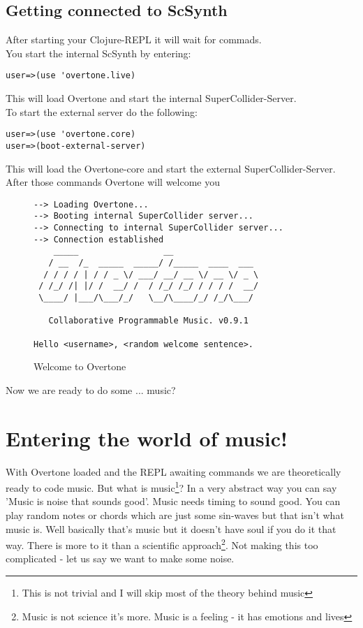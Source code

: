 \section{Getting connected to ScSynth}
After starting your Clojure-\gls{REPL} it will wait for commads.\\
You start the internal \gls{ScSynth} by entering:
\begin{lstlisting}
user=>(use 'overtone.live)
\end{lstlisting}
This will load Overtone and start the internal SuperCollider-Server.\\

To start the external server do the following:
\begin{lstlisting}
user=>(use 'overtone.core)
user=>(boot-external-server)
\end{lstlisting}
This will load the Overtone-core and start the external SuperCollider-Server.\\
After those commands Overtone will welcome you

\begin{figure}[h]
\caption{Welcome to Overtone}

\begin{lstlisting}
--> Loading Overtone...
--> Booting internal SuperCollider server...
--> Connecting to internal SuperCollider server...
--> Connection established
    _____                 __
   / __  /_  _____  _____/ /_____  ____  ___
  / / / / | / / _ \/ ___/ __/ __ \/ __ \/ _ \
 / /_/ /| |/ /  __/ /  / /_/ /_/ / / / /  __/
 \____/ |___/\___/_/   \__/\____/_/ /_/\___/

   Collaborative Programmable Music. v0.9.1

Hello <username>, <random welcome sentence>.

\end{lstlisting}

\end{figure}
Now we are ready to do some ... music?

\chapter{Entering the world of music!}
With Overtone loaded and the REPL awaiting commands we are theoretically ready to code music. But what is music\footnote{This is not trivial and I will skip most of the theory behind music}? In a very abstract way you can say 'Music is noise that sounds good'. Music needs timing to sound good. You can play random notes or chords which are just some sin-waves but that isn't what music is. Well basically that's music but it doesn't have soul if you do it that way. There is more to it than a scientific approach\footnote{Music is not science it's more. Music is a feeling - it has emotions and lives}.
Not making this too complicated - let us say we want to make some noise.\\


